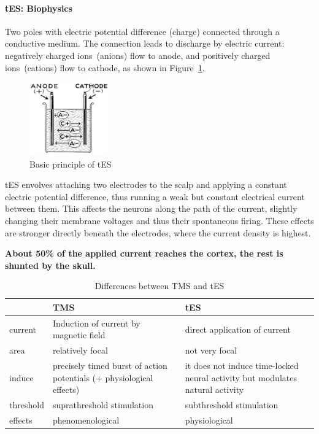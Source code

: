 \documentclass[12pt,article,oneside,a4paper]{memoir}
\begin{document}
\paragraph{tES: Biophysics}
Two poles with electric potential difference (charge) connected through a
conductive medium. The connection leads to discharge by electric current:
negatively charged ions~(anions) flow to anode, and positively charged
ions~(cations) flow to cathode, as shown in Figure~\ref{fig:tes}.

\begin{figure}
  \centering
  \includegraphics[width=0.3\textwidth]{imgs/tes.png}
  \caption{Basic principle of tES}
  \label{fig:tes}
\end{figure}

tES envolves attaching two electrodes to the scalp and applying a constant
electric potential difference, thus running a weak but constant electrical
current between them. This affects the neurons along the path of the current,
slightly changing their membrane voltages and thus their spontaneous firing.
These effects are stronger directly beneath the electrodes, where the current
density is highest.

\textbf{About 50\% of the applied current reaches the cortex, the rest is 
shunted by the skull.}

\begin{table}[h]
  \begin{tabular}{ l |  p{6cm} |  p{6cm} }
    \hline
     & TMS & tES \\ \hline
    current & Induction of current by magnetic field & direct application of
    current \\ \hline
    area & relatively focal & not very focal \\ \hline
    induce & precisely timed burst of action potentials (+ physiological
    effects) & it does not induce time-locked neural activity but modulates
    natural activity \\ \hline
	threshold & suprathreshold stimulation & subthreshold stimulation \\ \hline
    effects & phenomenological & physiological \\
    \hline
  \end{tabular}
  \caption{Differences between TMS and tES}
\end{table}
\end{document}
